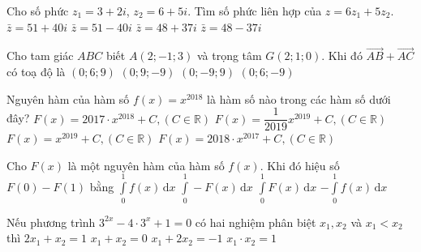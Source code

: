 \begin{ex}%
	Cho số phức $z_1=3+2i$, $z_2=6+5i$. Tìm số phức liên hợp của $z=6z_1+5z_2$.
	\choice
	{$\bar{z}=51+40i$}
	{$\bar{z}=51-40i$}
	{$\bar{z}=48+37i$}
	{\True $\bar{z}=48-37i$}
\end{ex}

\begin{ex}%
	Cho tam giác $ABC$ biết $A(2;-1;3)$ và trọng tâm $G(2;1;0)$. Khi đó $\vec{AB}+\vec{AC}$ có toạ độ là
	\choice
	{$\left(0;6;9\right)$}
	{$\left(0;9;-9\right)$}
	{$\left(0;-9;9\right)$}
	{\True $\left(0;6;-9\right)$}
\end{ex}

\begin{ex}%
	Nguyên hàm của hàm số $f(x)=x^{2018}$ là hàm số nào trong các hàm số dưới đây?
	\choice
	{$F(x)=2017\cdot x^{2018}+C, (C\in \mathbb{R})$}
	{\True $F(x)=\dfrac{1}{2019}x^{2019}+C, (C\in \mathbb{R})$}
	{$F(x)=x^{2019}+C, (C\in \mathbb{R})$}
	{$F(x)=2018\cdot x^{2017}+C, (C\in \mathbb{R})$}
\end{ex}

\begin{ex}%
	Cho $F(x)$ là một nguyên hàm của hàm số $f(x)$. Khi đó hiệu số $F(0)-F(1)$ bằng
	\choice
	{$\displaystyle\int\limits_0^1f(x)\mathrm{\,d}x$}
	{$\displaystyle\int\limits_0^1-F(x)\mathrm{\,d}x$}
	{$\displaystyle\int\limits_0^1F(x)\mathrm{\,d}x$}
	{\True $-\displaystyle\int\limits_0^1f(x)\mathrm{\,d}x$}
\end{ex}

\begin{ex}%
	Nếu phương trình $3^{2x}-4\cdot 3^x+1=0$ có hai nghiệm phân biệt $x_1, x_2$ và $x_1<x_2$ thì 
	\choice
	{$2x_1+x_2=1$}
	{\True $x_1+x_2=0$}
	{$x_1+2x_2=-1$}
	{$x_1\cdot x_2=1$}
\end{ex}

